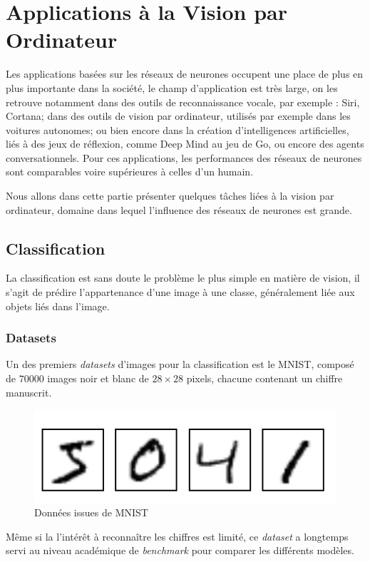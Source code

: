 \documentclass[a4paper, 11pt]{report}
\begin{document}
\section{Applications à la Vision par Ordinateur}
Les applications basées sur les réseaux de neurones occupent une place de plus en plus importante dans la société, le champ d'application est très large, on les retrouve notamment dans des outils de reconnaissance vocale, par exemple : Siri, Cortana; dans des outils de vision par ordinateur, utilisés par exemple dans les voitures autonomes; ou bien encore dans la création d'intelligences artificielles, liés à des jeux de réflexion, comme Deep Mind au jeu de Go, ou encore des agents conversationnels.
Pour ces applications, les performances des réseaux de neurones sont comparables voire supérieures à celles d'un humain.

Nous allons dans cette partie présenter quelques tâches liées à la vision par ordinateur, domaine dans lequel l'influence des réseaux de neurones est grande.
\subsection{Classification}
La classification est sans doute le problème le plus simple en matière de vision, il s'agit de prédire l'appartenance d'une image à une classe, généralement liée aux objets liés dans l'image.
\subsubsection{Datasets}
Un des premiers \emph{datasets} d'images pour la classification est le MNIST, composé de $70000$ images noir et blanc de $28 \times 28$ pixels, chacune contenant un chiffre manuscrit.
\begin{figure}[H]
	\begin{center}
		\includegraphics[scale=0.3]{Images/MNIST_Digits.png}
		\caption{Données issues de MNIST}
	\end{center}
\end{figure}
Même si la l'intérêt à reconnaître les chiffres est limité, ce \emph{dataset} a longtemps servi au niveau académique de \emph{benchmark} pour comparer les différents modèles.
\end{document}
